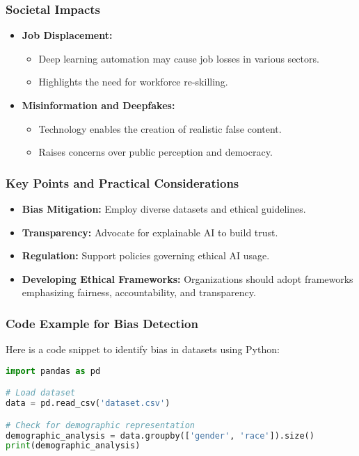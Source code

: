 \documentclass[aspectratio=169]{beamer}
\begin{document}
\begin{frame}[fragile]
    \frametitle{Societal Impacts}
    \begin{itemize}
        \item \textbf{Job Displacement:} 
        \begin{itemize}
            \item Deep learning automation may cause job losses in various sectors.
            \item Highlights the need for workforce re-skilling.
        \end{itemize}
        
        \item \textbf{Misinformation and Deepfakes:} 
        \begin{itemize}
            \item Technology enables the creation of realistic false content.
            \item Raises concerns over public perception and democracy.
        \end{itemize}
    \end{itemize}
\end{frame}

\begin{frame}[fragile]
    \frametitle{Key Points and Practical Considerations}
    \begin{itemize}
        \item \textbf{Bias Mitigation:} Employ diverse datasets and ethical guidelines.
        
        \item \textbf{Transparency:} Advocate for explainable AI to build trust.

        \item \textbf{Regulation:} Support policies governing ethical AI usage.

        \item \textbf{Developing Ethical Frameworks:}
        Organizations should adopt frameworks emphasizing fairness, accountability, and transparency.
    \end{itemize}
\end{frame}

\begin{frame}[fragile]
    \frametitle{Code Example for Bias Detection}
    Here is a code snippet to identify bias in datasets using Python:

    \begin{lstlisting}[language=Python]
import pandas as pd

# Load dataset
data = pd.read_csv('dataset.csv')

# Check for demographic representation
demographic_analysis = data.groupby(['gender', 'race']).size()
print(demographic_analysis)
    \end{lstlisting}
\end{frame}
\end{document}
